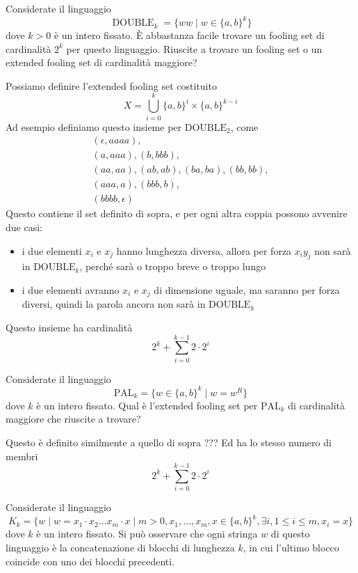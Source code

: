 \documentclass[12pt, answers]{exam}
\begin{document}
\begin{questions}
	\question Considerate il linguaggio
	$$ \operatorname{DOUBLE}_k = \{ ww \mid w \in \{ a, b \}^k \} $$
	dove $k > 0$ è un intero fissato.
	È abbastanza facile trovare un fooling set di cardinalità $2^k$ per questo linguaggio.
	Riuscite a trovare un fooling set o un extended fooling set di cardinalità maggiore?
	\begin{solution}
		Possiamo definire l'extended fooling set costituito 
		$$ X = \bigcup_{i = 0}^k \{a, b\}^i \times \{a, b\}^{k - i} $$
		Ad esempio definiamo questo insieme per $\text{DOUBLE}_2$, come
		\begin{align*}
			(\epsilon, aaaa), \\
			(a, aaa), (b, bbb), \\
			(aa, aa), (ab, ab), (ba, ba), (bb, bb), \\
			(aaa, a), (bbb, b), \\
			(bbbb, \epsilon)
		\end{align*}
		Questo contiene il set definito di sopra, e per ogni altra coppia possono avvenire due casi:
		\begin{itemize}
			\item i due elementi $x_i$ e $x_j$ hanno lunghezza diversa, allora per forza $x_i y_j$ non sarà in $\text{DOUBLE}_k$, perché sarà o troppo breve o troppo lungo
			\item i due elementi avranno $x_i$ e $x_j$ di dimensione uguale, ma saranno per forza diversi, quindi la parola ancora non sarà in $\text{DOUBLE}_k$
		\end{itemize}
		Questo insieme ha cardinalità 
		$$ 2^k + \sum_{i = 0}^{k - 1} 2 \cdot 2^i $$
	\end{solution}
	\question Considerate il linguaggio
	$$ \text{PAL}_k = \{ w \in \{a, b\}^k \mid w = w^R \} $$
	dove $k$ è un intero fissato.
	Qual è l'extended fooling set per $\text{PAL}_k$ di cardinalità maggiore che riuscite a trovare?
	\begin{solution}
		Questo è definito similmente a quello di sopra
		???
		Ed ha lo stesso numero di membri
		$$ 2^k + \sum_{i = 0}^{k - 1} 2 \cdot 2^i $$
	\end{solution}

	\question Considerate il linguaggio
	$$ K_k = \{ w \mid w = x_1 \cdot x_2 \dots x_m \cdot x \mid m > 0, x_1, \dots, x_m, x \in \{a, b\}^k, \exists i, 1 \leq i \leq m, x_i = x\}$$
	dove $k$ è un intero fissato.
	Si può osservare che ogni stringa $w$ di questo linguaggio è la concatenazione di blocchi di lunghezza $k$, in cui l'ultimo blocco coincide con uno dei blocchi precedenti.
	\begin{parts}

\end{parts}
\end{questions}
\end{document}
